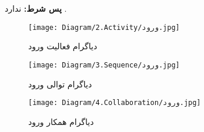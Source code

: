 \noindent
\textbf{پس شرط:}
ندارد .

\begin{figure}[H]
	\centering
	\texttt{[image: Diagram/2.Activity/ورود.jpg]}
	\caption{دیاگرام فعالیت ورود}
	\label{fig:a:ورود}
\end{figure}
\begin{figure}[H]
	\centering
	\texttt{[image: Diagram/3.Sequence/ورود.jpg]}
	\caption{دیاگرام توالی ورود}
	\label{fig:s:ورود}
\end{figure}
\begin{figure}[H]
\centering
\texttt{[image: Diagram/4.Collaboration/ورود.jpg]}
\caption{دیاگرام همکار ورود}
\label{fig:c:ورود}
\end{figure}
